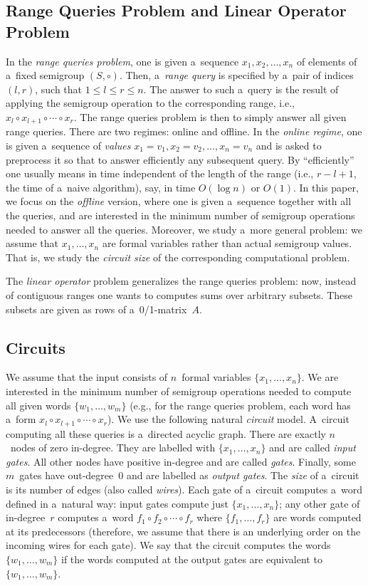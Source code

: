 \documentclass[11pt,letterpaper]{article}
\begin{document}
\subsection{Range Queries Problem and Linear Operator Problem}
In the {\em range queries problem}, one is given 
a~sequence $x_1, x_2, \dotsc, x_n$ of
elements of a~fixed semigroup $(S, \circ)$. 
Then, a~\emph{range query} is
specified by a~pair of indices $(l,r)$, such that $1 \le l \le r \le n$. 
The answer to such a~query is the result of applying the semigroup 
operation to the
corresponding range, i.e., $x_l \circ x_{l+1} \circ \dotsb \circ x_r$. 
The range queries problem is then to simply answer all given range 
queries. 
There are two
regimes: online and offline. In the {\em online regime}, one is given
a~sequence of {\em values} 
$x_1=v_1, x_2=v_2, \dotsc, x_n=v_n$ and is asked to preprocess 
it so that to
answer efficiently any subsequent query. 
By ``efficiently'' one usually
means in time independent of the length of the range 
(i.e., $r-l+1$, the time
of a~naive algorithm), say, in time $O(\log n)$ or $O(1)$. 
In this paper, we
focus on the {\em offline} version, where one is given a~sequence 
together with
all the queries, and are interested in the minimum number of 
semigroup
operations needed to answer all the queries. Moreover, we study 
a~more general
problem: we assume that $x_1, \dotsc, x_n$ are formal variables 
rather than
actual semigroup values. That is, we study the {\em circuit size} of 
the corresponding
computational problem.

The {\em linear operator} problem generalizes the range 
queries problem: now, instead of contiguous ranges one wants 
to computes sums over arbitrary subsets. These subsets are
given as rows of a~0/1-matrix~$A$.

\subsection{Circuits}
We assume that the input consists of $n$~formal variables
$\{x_1, \dotsc, x_n\}$. We are interested in the minimum number of semigroup
operations needed to compute all given words $\{w_1, \dotsc, w_m\}$ (e.g., for
the range queries problem, each word has a~form $x_l\circ x_{l+1}\circ \dotsb \circ x_r$). We use
the following natural {\em circuit} model. A~circuit computing all these queries
is a~directed acyclic graph. There are exactly $n$~nodes of zero in-degree. They
are labelled with $\{x_1, \dotsc, x_n\}$ and are called {\em input gates}. All
other nodes have positive in-degree and are called {\em gates}. Finally, some
$m$~gates have out-degree~0 and are labelled as {\em output gates}. The
{\em size} of a~circuit is its number of edges (also called {\em wires}). Each
gate of a~circuit computes a~word defined in a~natural way: input gates compute
just $\{x_1, \dotsc, x_n\}$; any other gate of in-degree~$r$ computes a~word
$f_1 \circ f_2 \circ \dotsb \circ f_r$ where $\{f_1, \dotsc, f_r\}$ are words
computed at its predecessors (therefore, we assume that there is an underlying
order on the incoming wires for each gate). We say that the circuit computes the
words $\{w_1, \dotsc, w_m\}$ if the words computed at the output gates are
equivalent to $\{w_1, \dotsc, w_m\}$.
\end{document}
